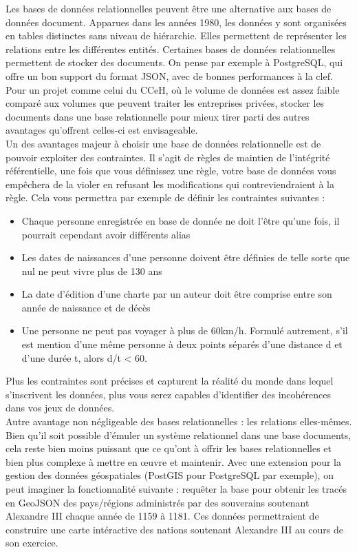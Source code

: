 Les bases de données relationnelles peuvent être une alternative aux bases de données document. Apparues dans les années 1980, les données y sont organisées en tables distinctes sans niveau de hiérarchie. Elles permettent de représenter les relations entre les différentes entités. Certaines bases de données relationnelles permettent de stocker des documents. On pense par exemple à PostgreSQL, qui offre un bon support du format JSON, avec de bonnes  performances à la clef. Pour un projet comme celui du CCeH, où le volume de données est assez faible comparé aux volumes que peuvent traiter les entreprises privées, stocker les documents dans une base relationnelle pour mieux tirer parti des autres avantages qu’offrent celles-ci est envisageable.\\ 
Un des avantages majeur à choisir une base de données relationnelle est de pouvoir exploiter des contraintes. Il s’agit de règles de maintien  de l’intégrité référentielle, une fois que vous définissez une règle, votre base de données vous empêchera de la violer en refusant les modifications qui contreviendraient à la règle. Cela vous permettra par exemple de définir les contraintes suivantes :\\
\begin{itemize}
    \item Chaque personne enregistrée en base de donnée ne doit l’être qu’une fois, il pourrait cependant avoir différents alias
    \item Les dates de naissances d’une personne doivent être définies de telle sorte que nul ne peut vivre plus de 130 ans
    \item La date d’édition d’une charte par un auteur doit être comprise entre son année de naissance et de décès
    \item Une personne ne peut pas voyager à plus de 60km/h. Formulé autrement, s’il est mention d’une même personne à deux points séparés d’une distance d et d’une durée t, alors d/t < 60.\\
    
\end{itemize}

\noindent Plus les contraintes sont précises et capturent la réalité du monde dans lequel s’inscrivent les données, plus vous serez capables d’identifier des incohérences dans vos jeux de données.\\
Autre avantage non négligeable des bases relationnelles : les relations elles-mêmes. Bien qu’il soit possible d’émuler un système relationnel dans une base documents, cela reste bien moins puissant que ce qu’ont à offrir les bases relationnelles et bien plus complexe à mettre en œuvre et maintenir.
Avec une extension pour la gestion des données géospatiales (PostGIS pour PostgreSQL par exemple), on peut imaginer la fonctionnalité suivante : requêter la base pour obtenir les tracés en GeoJSON des pays/régions administrés par des souverains soutenant Alexandre III chaque année de 1159 à 1181. Ces données permettraient de construire une carte intéractive des nations soutenant Alexandre III au cours de son exercice.


